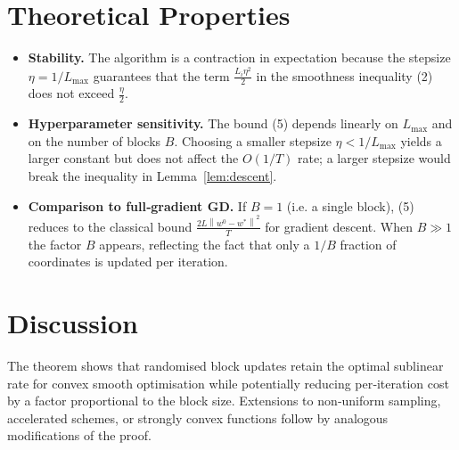 \documentclass[11pt]{article}
\newcommand{\norm}[1]{\left\|#1\right\|}
\begin{document}
\section*{Theoretical Properties}
\begin{itemize}[leftmargin=*]
\item \textbf{Stability.} The algorithm is a contraction in expectation
because the stepsize $\eta=1/L_{\max}$ guarantees that the term
$\frac{L_{i}\eta^{2}}{2}$ in the smoothness inequality (2) does not exceed
$\frac{\eta}{2}$.
\item \textbf{Hyperparameter sensitivity.}
The bound (5) depends linearly on $L_{\max}$ and on the number of blocks $B$.
Choosing a smaller stepsize $\eta<1/L_{\max}$ yields a larger constant
but does not affect the $O(1/T)$ rate; a larger stepsize would break the
inequality in Lemma~\ref{lem:descent}.
\item \textbf{Comparison to full‑gradient GD.}
If $B=1$ (i.e. a single block), (5) reduces to the classical bound
$\frac{2L\norm{w^{0}-w^{*}}^{2}}{T}$ for gradient descent.
When $B\gg1$ the factor $B$ appears, reflecting the fact that only a
$1/B$ fraction of coordinates is updated per iteration.
\end{itemize}

\section*{Discussion}
The theorem shows that randomised block updates retain the optimal
sublinear rate for convex smooth optimisation while potentially reducing
per‑iteration cost by a factor proportional to the block size. Extensions
to non‑uniform sampling, accelerated schemes, or strongly convex functions
follow by analogous modifications of the proof.

\newpage
\end{document}
